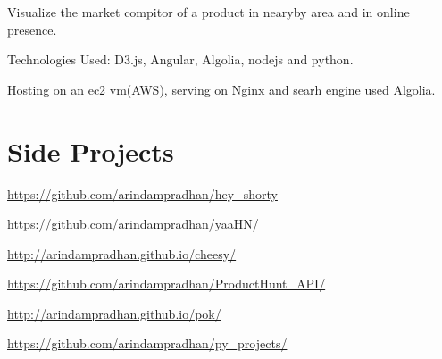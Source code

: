 \documentclass[]{deedy-resume-openfont}
\begin{document}
\begin{minipage}[t]{0.66\textwidth}
\vspace{\topsep} %
\begin{tightemize}
\item Visualize the market compitor of a product in nearyby area and in online presence.
\item Technologies Used: D3.js, Angular, Algolia, nodejs and python.
\item Hosting on an ec2 vm(AWS), serving on Nginx and searh engine used Algolia.
\vspace{\topsep} %
\end{tightemize}



\section{Side Projects}

{ \url{https://github.com/arindampradhan/hey_shorty} }\\
\sectionsep

{ \url{https://github.com/arindampradhan/yaaHN/} }\\
\sectionsep

{ \url{http://arindampradhan.github.io/cheesy/} }\\
\sectionsep

{ \url{https://github.com/arindampradhan/ProductHunt_API/} }\\
\sectionsep

{ \url{http://arindampradhan.github.io/pok/} }\\
\sectionsep

{ \url{https://github.com/arindampradhan/py_projects/} }\\
\sectionsep



\end{minipage}
\end{document}
